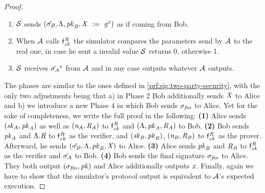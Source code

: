 \begin{proof}
\begin{enumerate}
        \item $\mathcal{S}$ sends $(\hat{\sigma_{\mathit{B}}}, \Lambda, \mathit{pk}_{\mathit{B}}, \mathit{X} ~:=~ \mathit{g}^{\mathit{x}})$ as if coming from Bob.
        \item When $\mathcal{A}$ calls $\mathsf{f}^{\mathit{R}}_{zk}$ the simulator compares the parameters send by $\mathcal{A}$ to the real one, in case he sent a invalid value $\mathcal{S}$ returns 0, otherwise 1.
        \item $\mathcal{S}$ receives $\tilde{\sigma_{\mathit{A}}}^*$ from $\mathcal{A}$ and in any case outputs whatever $\mathcal{A}$ outputs.
    \end{enumerate}

    The phases are similar to the ones defined in \cref{prf:sig:two-party-security}, with the only two adjustments being that a) in Phase 2 Bob additionally sends $\mathit{X}$ to Alice and b) we introduce a new Phase 4 in which Bob sends $\sigma_{\mathit{fin}}$ to Alice.
    Yet for the sake of completeness, we write the full proof in the following:
    \textbf{(1)} Alice sends $(\mathit{sk}_{\mathit{A}}, \mathit{pk}_{\mathit{A}})$ as well as $(\mathit{\mathit{n}_{\mathit{A}}}, \mathit{R}_{\mathit{A}})$ to $\mathsf{f}^{\mathit{R}}_{zk}$ and $(\Lambda, \mathit{pk}_{\mathit{A}}, \mathit{R}_{\mathit{A}})$ to Bob.
    \textbf{(2)} Bob sends $\mathit{pk}_{\mathit{A}}$ and $\Lambda.\mathit{R}$ to $\mathsf{f}^{\mathit{R}}_{zk}$ as the verifier, and  $(\mathit{sk}_{\mathit{B}}, \mathit{pk}_{\mathit{B}})$, $(\mathit{\mathit{n}_{\mathit{B}}}, \mathit{R}_{\mathit{B}})$ to $\mathsf{f}^{\mathit{R}}_{zk}$ as the prover.
    Afterward, he sends $(\tilde{\sigma_{\mathit{B}}}, \Lambda, \mathit{pk}_{\mathit{B}}, \mathit{X})$ to Alice.
    \textbf{(3)} Alice sends $\mathit{pk}_{\mathit{B}}$ and $\mathit{R}_{\mathit{B}}$ to $\mathsf{f}^{\mathit{R}}_{zk}$ as the verifier and $\tilde{\sigma_{\mathit{A}}}$ to Bob.
    \textbf{(4)} Bob sends the final signature $\sigma_{\mathit{fin}}$ to Alice.
    They both output $(\sigma_{\mathit{fin}}, \mathit{pk})$ and Alice additionally outputs $\mathit{x}$.
    Finally, again we have to show that the simulator's protocol output is equivalent to $\mathcal{A}$'s expected execution.


\end{proof}
